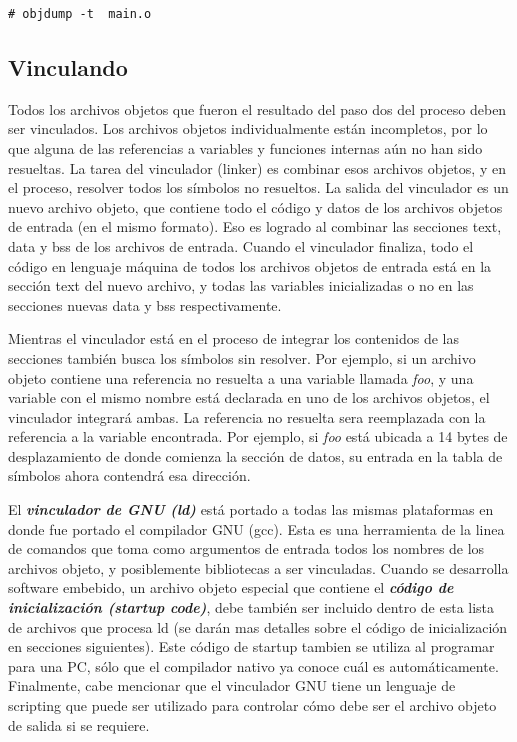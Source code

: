 \documentclass[output=paper, 
colorlinks,
citecolor=brown,
newtxmath
]{langscibook}
\begin{document}
\begin{verbatim}
# objdump -t  main.o
\end{verbatim}

\subsection {Vinculando}

Todos los archivos objetos que fueron el resultado del paso dos del proceso deben
ser vinculados. Los archivos objetos individualmente están incompletos, por lo que
alguna de las referencias a variables y funciones internas aún no han sido resueltas.
La tarea del vinculador (linker) es combinar esos archivos objetos, y en el proceso,
resolver todos los símbolos no resueltos. La salida del vinculador es un nuevo archivo objeto, que contiene todo el código y datos
de los archivos objetos de entrada (en el mismo formato).
Eso es logrado al combinar las secciones text, data y bss de los archivos de entrada.
Cuando el vinculador finaliza, todo el código en lenguaje máquina de todos los archivos
objetos de entrada está en la sección text del nuevo archivo, y todas las variables
inicializadas o no en las secciones nuevas data y bss respectivamente.

Mientras el vinculador está en el proceso de integrar 
los contenidos de las secciones también 
busca los símbolos sin resolver. Por ejemplo, si un archivo objeto contiene 
una referencia no resuelta a  una variable llamada \textit{foo}, y una variable con 
el mismo nombre está declarada en uno de los archivos objetos, el vinculador
integrará ambas. La referencia no resuelta sera reemplazada con la referencia
a la variable encontrada. Por ejemplo, si \textit{foo} está ubicada a 14 bytes de desplazamiento
de donde comienza la sección de datos, su entrada en la tabla de símbolos ahora
contendrá esa dirección.

El \textit{\textbf{vinculador de GNU (ld)}} está portado a todas las mismas plataformas en donde
fue portado el compilador GNU (gcc). Esta es una herramienta de la linea de comandos
que toma como argumentos de entrada todos los nombres de los archivos objeto, 
y posiblemente bibliotecas a ser vinculadas.
Cuando se desarrolla software embebido, un archivo objeto especial que contiene el \textit{\textbf{código de 
inicialización (startup code)}}, debe también ser incluido dentro de esta
lista de archivos que procesa ld (se darán mas detalles sobre el código
de inicialización en secciones siguientes). Este código de startup
tambien se utiliza al programar para una PC, sólo que el compilador nativo
ya conoce cuál es automáticamente. Finalmente, cabe mencionar
que el vinculador GNU tiene un lenguaje de scripting que puede ser utilizado
para controlar cómo debe ser el archivo objeto de salida si se requiere.
\end{document}
